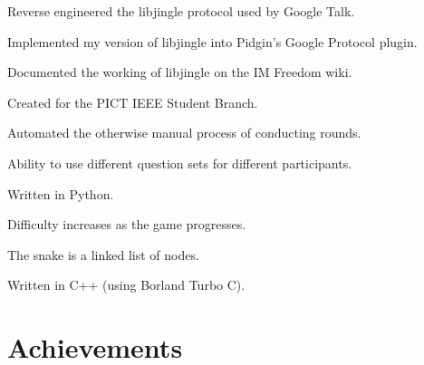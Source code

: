 \documentclass[letterpaper]{deedy-resume} %
\begin{document}
\begin{minipage}[t]{0.66\textwidth}

\begin{tightitemize}
\item Reverse engineered the libjingle protocol used by Google Talk.
\item Implemented my version of libjingle into Pidgin's Google Protocol plugin.
\item Documented the working of libjingle on the IM Freedom wiki.
\end{tightitemize}

\sectionspace %



\begin{tightitemize}
\item Created for the PICT IEEE Student Branch.
\item Automated the otherwise manual process of conducting rounds.
\item Ability to use different question sets for different participants.
\item Written in Python.
\end{tightitemize}

\sectionspace %



\begin{tightitemize}
\item Difficulty increases as the game progresses.
\item The snake is a linked list of nodes.
\item Written in C++ (using Borland Turbo C).
\end{tightitemize}

\sectionspace %


\section{Achievements}


\end{minipage}
\end{document}
